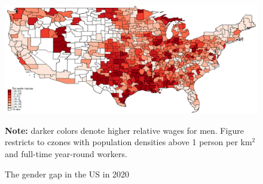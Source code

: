 \begin{figure}[!h]
\centering
\caption{The gender gap in the US in 2020}
\label{fig:gap_map2020}
\includegraphics[width=1\textwidth]{../2_analysis/output/figures/raw_wage_map2020_full_time}
\par \begin{minipage}[h]{\textwidth}{\scriptsize\textbf{Note:} darker colors denote higher relative wages for men. Figure restricts to czones with population densities above 1 person per km$^2$ and full-time year-round workers.}\end{minipage}
\end{figure}
